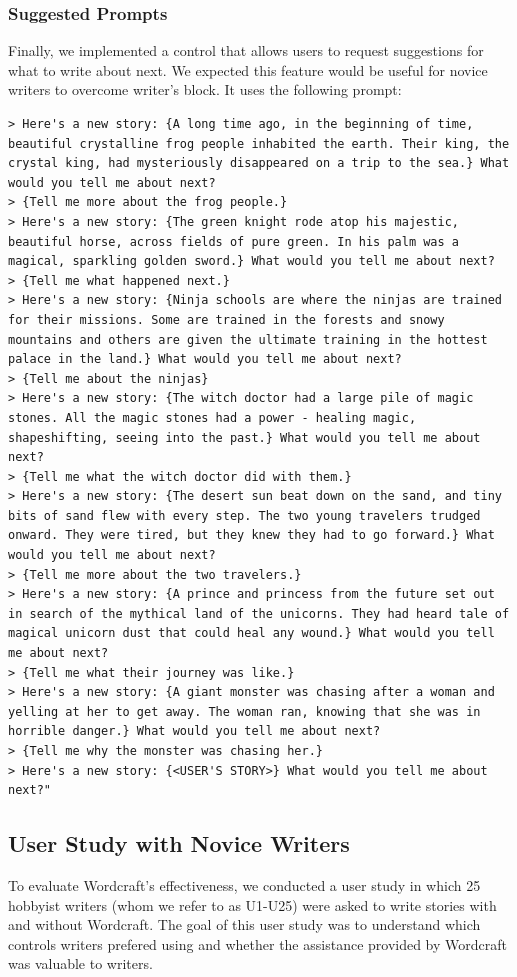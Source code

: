 \subsubsection {Suggested Prompts}
Finally, we implemented a control that allows users to request suggestions for what to write about next.
We expected this feature would be useful for novice writers to overcome writer's block.
It uses the following prompt:

\begin{lstlisting}
> Here's a new story: {A long time ago, in the beginning of time, beautiful crystalline frog people inhabited the earth. Their king, the crystal king, had mysteriously disappeared on a trip to the sea.} What would you tell me about next?
> {Tell me more about the frog people.}
> Here's a new story: {The green knight rode atop his majestic, beautiful horse, across fields of pure green. In his palm was a magical, sparkling golden sword.} What would you tell me about next?
> {Tell me what happened next.}
> Here's a new story: {Ninja schools are where the ninjas are trained for their missions. Some are trained in the forests and snowy mountains and others are given the ultimate training in the hottest palace in the land.} What would you tell me about next?
> {Tell me about the ninjas}
> Here's a new story: {The witch doctor had a large pile of magic stones. All the magic stones had a power - healing magic, shapeshifting, seeing into the past.} What would you tell me about next?
> {Tell me what the witch doctor did with them.}
> Here's a new story: {The desert sun beat down on the sand, and tiny bits of sand flew with every step. The two young travelers trudged onward. They were tired, but they knew they had to go forward.} What would you tell me about next?
> {Tell me more about the two travelers.}
> Here's a new story: {A prince and princess from the future set out in search of the mythical land of the unicorns. They had heard tale of magical unicorn dust that could heal any wound.} What would you tell me about next?
> {Tell me what their journey was like.}
> Here's a new story: {A giant monster was chasing after a woman and yelling at her to get away. The woman ran, knowing that she was in horrible danger.} What would you tell me about next?
> {Tell me why the monster was chasing her.}
> Here's a new story: {<USER'S STORY>} What would you tell me about next?"
\end{lstlisting}

\subsection{User Study with Novice Writers}
To evaluate Wordcraft's effectiveness, we conducted a user study in which 25 hobbyist writers (whom we refer to as U1-U25) were asked to write stories with and without Wordcraft.
The goal of this user study was to understand which controls writers prefered using and whether the assistance provided by Wordcraft was valuable to writers.


